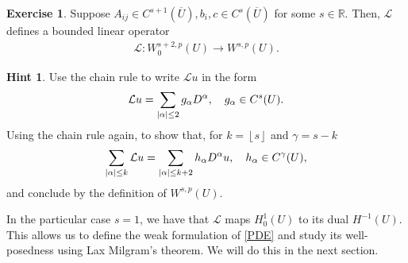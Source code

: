 \documentclass[
    a4paper,
    DIV=14,
    abstract=true,
    numbers=noenddot
]
{scrartcl}
\theoremstyle{definition}
\newtheorem{exercise}{Exercise}
\newtheorem*{hint}{Hint}
\newcommand{\R}{\mathbb{R}}
\newcommand{\Ll}{\mathcal{L}}
\begin{document}
\begin{exercise}\label{domain L}
	Suppose $A_{ij} \in C^{s+1}(\overline{U} ), b_i, c \in C^{s}(\overline{U} )$   for some $s \in \R$. Then, $\Ll $ defines  a bounded linear operator
	\begin{align*}
		\Ll : W_0^{s+2,p}(U)\to W^{s,p} (U).
	\end{align*}
\end{exercise}
\begin{hint}
	Use the chain rule to write $\Ll u$ in the form
	\begin{align*}
		\Ll u =\sum_{\abs{\alpha} \leq 2 } g_\alpha D^\alpha, \quad g_\alpha \in C ^{s}(U).
	\end{align*}
	Using the chain rule again, to show that, for $k=\left\lfloor s \right\rfloor$ and $\gamma =s-k$
	\begin{align*}
		\sum_{\abs{\alpha} \leq k} \Ll u = \sum_{\abs{\alpha} \leq k+2} h_\alpha D^\alpha u, \quad h_\alpha \in C^{\gamma }(U),
	\end{align*}
	and conclude by the definition of $W^{s,p}(U)$.
\end{hint}
In the particular case $s=1$,  we have that $\Ll $ maps $H_0^1(U)$ to its dual $H^{-1}(U)$. This allows us to define the weak formulation of \eqref{PDE} and study its well-posedness using Lax Milgram's theorem. We will do this in the next section.
\end{document}
